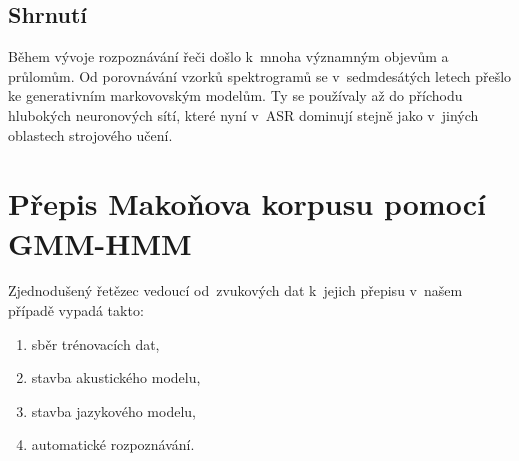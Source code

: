 \subsection{Shrnutí}

Během vývoje rozpoznávání řeči došlo k~mnoha významným objevům a průlomům.
Od porovnávání vzorků spektrogramů se v~sedmdesátých letech přešlo ke
generativním markovovským modelům. Ty se používaly až do příchodu hlubokých
neuronových sítí, které nyní v~ASR dominují stejně jako v~jiných oblastech
strojového učení.

\section{Přepis Makoňova korpusu pomocí GMM-HMM}




Zjednodušený řetězec vedoucí od~zvukových dat k~jejich přepisu v~našem případě
vypadá takto:\begin{enumerate}
\item{sběr trénovacích dat,}
\item{stavba akustického modelu,}
\item{stavba jazykového modelu,}
\item{automatické rozpoznávání.}
\end{enumerate}


